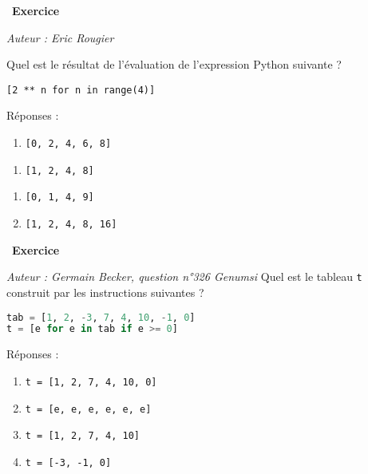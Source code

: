 \documentclass[
  11pt,
]{article}
\newcommand{\passthrough}[1]{#1}
\providecommand{\tightlist}{%
  \setlength{\itemsep}{0pt}\setlength{\parskip}{0pt}}
\newcounter{exo}
\newenvironment{exercice}[1]
{\par \medskip   \addtocounter{exo}{1} \noindent  
\begin{bclogo}[arrondi =0.1,   noborder = true, logo=\bccrayon, marge=4]{~\textbf{Exercice} \textbf{\theexo} {\itshape #1} }  \par}
{
\end{bclogo}
 \par \bigskip }
\newcounter{def}
\begin{document}
\begin{exercice}{}

\emph{Auteur : Eric Rougier}

Quel est le résultat de l'évaluation de l'expression Python suivante ?

\passthrough{\lstinline![2 ** n for n in range(4)]!}

Réponses :

\begin{enumerate}
\def\labelenumi{\arabic{enumi}.}
\tightlist
\item
  \passthrough{\lstinline![0, 2, 4, 6, 8]!}
\end{enumerate}

\begin{enumerate}
\def\labelenumi{\Alph{enumi})}
\setcounter{enumi}{1}
\tightlist
\item
  \passthrough{\lstinline![1, 2, 4, 8]!}
\end{enumerate}

\begin{enumerate}
\def\labelenumi{\arabic{enumi}.}
\setcounter{enumi}{2}
\tightlist
\item
  \passthrough{\lstinline![0, 1, 4, 9]!}
\item
  \passthrough{\lstinline![1, 2, 4, 8, 16]!}
\end{enumerate}

\end{exercice}

\begin{exercice}{}

\emph{Auteur : Germain Becker, question n°326 Genumsi} Quel est le
tableau \passthrough{\lstinline!t!} construit par les instructions
suivantes ?

\begin{lstlisting}[language=Python]
tab = [1, 2, -3, 7, 4, 10, -1, 0]
t = [e for e in tab if e >= 0]
\end{lstlisting}

Réponses :

\begin{enumerate}
\def\labelenumi{\arabic{enumi}.}
\tightlist
\item
  \passthrough{\lstinline!t = [1, 2, 7, 4, 10, 0]!}
\item
  \passthrough{\lstinline!t = [e, e, e, e, e, e]!}
\item
  \passthrough{\lstinline!t = [1, 2, 7, 4, 10]!}
\item
  \passthrough{\lstinline!t = [-3, -1, 0]!}
\end{enumerate}

\end{exercice}
\end{document}
